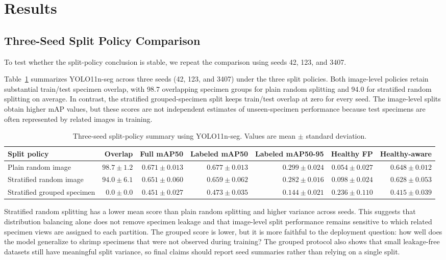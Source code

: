 \documentclass{svproc}
\begin{document}
\section{Results}

\subsection{Three-Seed Split Policy Comparison}
To test whether the split-policy conclusion is stable, we repeat the
comparison using seeds 42, 123, and 3407.

Table~\ref{tab:split_policy_summary} summarizes YOLO11n-seg across
three seeds (42, 123, and 3407) under the three split policies. Both
image-level policies retain substantial train/test specimen overlap,
with 98.7 overlapping specimen groups for plain random splitting and
94.0 for stratified random splitting on average. In contrast, the
stratified grouped-specimen split keeps train/test overlap at zero for
every seed. The image-level splits obtain higher mAP values, but these
scores are not independent estimates of unseen-specimen performance
because test specimens are often represented by related images in
training.

\begin{table}
\caption{Three-seed split-policy summary using YOLO11n-seg. Values are mean $\pm$ standard deviation.}
\label{tab:split_policy_summary}
\begin{center}
\scriptsize
\begin{tabular}{lrrrrrr}
\hline
Split policy & Overlap & Full mAP50 & Labeled mAP50 & Labeled mAP50-95 & Healthy FP & Healthy-aware \\
\hline
Plain random image & $98.7 \pm 1.2$ & $0.671 \pm 0.013$ & $0.677 \pm 0.013$ & $0.299 \pm 0.024$ & $0.054 \pm 0.027$ & $0.648 \pm 0.012$ \\
Stratified random image & $94.0 \pm 6.1$ & $0.651 \pm 0.060$ & $0.659 \pm 0.062$ & $0.282 \pm 0.016$ & $0.098 \pm 0.024$ & $0.628 \pm 0.053$ \\
Stratified grouped specimen & $0.0 \pm 0.0$ & $0.451 \pm 0.027$ & $0.473 \pm 0.035$ & $0.144 \pm 0.021$ & $0.236 \pm 0.110$ & $0.415 \pm 0.039$ \\
\hline
\end{tabular}
\end{center}
\end{table}
Stratified random splitting has a lower mean score than plain random
splitting and higher variance across seeds. This suggests that
distribution balancing alone does not remove specimen leakage and that
image-level split performance remains sensitive to which related
specimen views are assigned to each partition.
The grouped score is lower, but it is more faithful to the deployment
question: how well does the model generalize to shrimp specimens that
were not observed during training? The grouped protocol also shows that
small leakage-free datasets still have meaningful split variance, so
final claims should report seed summaries rather than relying on a
single split. 
\end{document}
